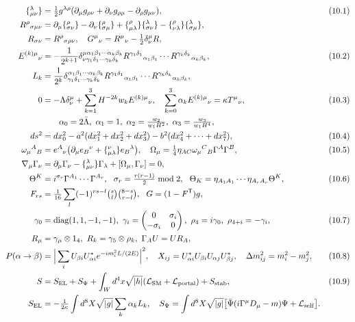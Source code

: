 \documentclass[10pt,a4paper]{article}
\begin{document}
\begin{align*}
\{{}^{\lambda}_{\mu\nu}\}&=\tfrac12g^{\lambda\rho}(\partial_\mu g_{\rho\nu}+\partial_\nu g_{\rho\mu}-\partial_\rho g_{\mu\nu}),&&(10.1) \\
R^\rho{}_{\sigma\mu\nu}&=\partial_\mu\{{}^{\rho}_{\sigma\nu}\}-\partial_\nu\{{}^{\rho}_{\sigma\mu}\}+\{{}^{\rho}_{\mu\lambda}\}\{{}^{\lambda}_{\sigma\nu}\}-\{{}^{\rho}_{\nu\lambda}\}\{{}^{\lambda}_{\sigma\mu}\}, \\
R_{\sigma\nu}&=R^\rho{}_{\sigma\rho\nu},\quad G^\mu{}_\nu=R^\mu{}_\nu-\tfrac12\delta^\mu_\nu R, \\
E^{(k)\mu}{}_\nu&=-\frac{1}{2^{k+1}}\delta^{\mu\alpha_1\beta_1\cdots\alpha_k\beta_k}_{\nu\gamma_1\delta_1\cdots\gamma_k\delta_k}R^{\gamma_1\delta_1}{}_{\alpha_1\beta_1}\cdots R^{\gamma_k\delta_k}{}_{\alpha_k\beta_k},&&(10.2) \\
L_k&=\frac1{2^k}\delta^{\alpha_1\beta_1\cdots\alpha_k\beta_k}_{\gamma_1\delta_1\cdots\gamma_k\delta_k}R^{\gamma_1\delta_1}{}_{\alpha_1\beta_1}\cdots R^{\gamma_k\delta_k}{}_{\alpha_k\beta_k}, \\
0&=-\Lambda\delta^\mu_\nu+\sum_{k=1}^3H^{-2k}w_kE^{(k)\mu}{}_\nu,\quad \sum_{k=0}^3\alpha_kE^{(k)\mu}{}_\nu=\kappa T^\mu{}_\nu,&&(10.3) \\
&\qquad \alpha_0=2\bar\Lambda,\ \alpha_1=1,\ \alpha_2=\tfrac{w_2}{w_1H^2},\ \alpha_3=\tfrac{w_3}{w_1H^4}, \\
ds^2&=dx_0^2-a^2(dx_1^2+dx_2^2+dx_3^2)-b^2(dx_4^2+\cdots+dx_7^2),&&(10.4) \\
\omega_\mu{}^A{}_B&=e^A{}_\nu\big(\partial_\mu e_B{}^\nu+\{{}^{\nu}_{\mu\lambda}\}e_B{}^\lambda\big),\quad \Omega_\mu=\tfrac14\eta_{AC}\omega_\mu{}^C{}_B\Gamma^A\Gamma^B,&&(10.5) \\
\nabla_\mu\Gamma_\nu&=\partial_\mu\Gamma_\nu-\{{}^{\lambda}_{\mu\nu}\}\Gamma_\lambda+[\Omega_\mu,\Gamma_\nu]=0, \\
\Theta^K&=i^{\sigma_r}\Gamma^{A_1}\cdots\Gamma^{A_r},\ \ \sigma_r=\tfrac{r(r-1)}2\bmod2,\ \ \Theta_K=\eta_{A_1A_1}\cdots\eta_{A_rA_r}\Theta^K,&&(10.6) \\
F_{rs}&=\tfrac1{16}\sum_l(-1)^{rs-l}\tbinom sl\tbinom{8-s}{r-l},\ \ G=(1-F^{\mathsf T})g, \\
\gamma_0&=\mathrm{diag}(1,1,-1,-1),\ \gamma_i=\begin{pmatrix}0&\sigma_i\\-\sigma_i&0\end{pmatrix},\ \rho_4=i\gamma_0,\ \rho_{4+i}=-\gamma_i,&&(10.7) \\
R_\mu&=\gamma_\mu\otimes1_4,\ R_k=\gamma_5\otimes\rho_k,\ \Gamma_AU=UR_A, \\
P(\alpha\to\beta)&=\Big|\sum_iU_{\beta i}U^*_{\alpha i}e^{-im_i^2L/(2E)}\Big|^2,\quad X_{ij}=U^*_{\alpha i}U_{\beta i}U_{\alpha j}U^*_{\beta j},\quad \Delta m^2_{ij}=m_i^2-m_j^2,&&(10.8) \\
S&=S_{\rm EL}+S_\Psi+\int_Wd^4x\sqrt{|h|}(\mathcal L_{\rm SM}+\mathcal L_{\rm portal})+S_{\rm stab},&&(10.9) \\
S_{\rm EL}&=-\tfrac1{2\kappa}\int d^8X\sqrt{|g|}\sum_k\alpha_kL_k,\quad S_\Psi=\int d^8X\sqrt{|g|}\big[\bar\Psi(i\Gamma^\mu D_\mu-m)\Psi+\mathcal L_{\rm self}\big].
\end{align*}
\end{document}
